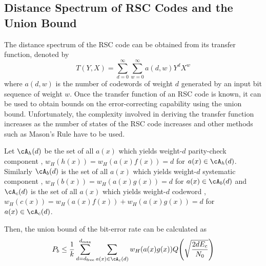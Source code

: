 \subsection{ Distance Spectrum of RSC Codes and the Union Bound}
\label{sec4}

The distance spectrum of the RSC code can be obtained from its transfer function, denoted by $$T(Y,X)=\sum_{d=0}^{\infty}\sum_{w=0}^{\infty} a(d,w)Y^dX^w$$ where $a(d,w)$ is the number of codewords of weight $d$ generated by an input bit sequence of weight $w$. 
Once the transfer function of an RSC code is known, it can be used to obtain bounds on the error-correcting capability using the union bound.
Unfortunately, the complexity involved in deriving the transfer function increases as the number of states of the RSC code increases and other methods such as Mason's Rule \cite{ref3} have to be used. 

 Let $\cA_h(d)$ be the set of all $a(x)$ which yields weight-$d$ parity-check component \ie, $w_H(h(x))=w_H(a(x)f(x))=d$ for $a(x) \in \cA_h(d)$. 
Similarly $\cA_b(d)$ is the set of all $a(x)$ which yields weight-$d$ systematic component \ie, $w_H(b(x))=w_H(a(x)g(x))=d$ for $a(x) \in \cA_b(d)$
 and $\cA_c(d)$ is the set of all $a(x)$ which yields weight-$d$ codeword \ie, $w_H(c(x))=w_H(a(x)f(x))+ w_H(a(x)g(x))=d$ for $a(x) \in \cA_c(d)$.  

Then, the union bound of the bit-error rate \cite{ref4} can be calculated as 
\begin{align}
P_b \leq \frac{1}{k} \sum_{d=d_{\text{free}}}^{d_{\text{max}}} \sum_{a(x) \in \cA_c(d)}w_H(a(x)g(x)) Q\Bigg( \sqrt{\frac{2dE_c}{N_0}}\Bigg)
\label{novelEq7}
\end{align}


